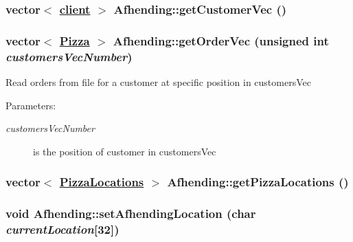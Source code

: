 \hypertarget{class_afhending_3970b0afe27b514282442b11592e1602}{
\subsubsection[getCustomerVec]{\setlength{\rightskip}{0pt plus 5cm}vector$<$ \hyperlink{classclient}{client} $>$ Afhending::get\-Customer\-Vec ()}}
\label{class_afhending_3970b0afe27b514282442b11592e1602}


\hypertarget{class_afhending_ad0cbeddec394b25c5eade57247f4110}{
\subsubsection[getOrderVec]{\setlength{\rightskip}{0pt plus 5cm}vector$<$ \hyperlink{class_pizza}{Pizza} $>$ Afhending::get\-Order\-Vec (unsigned int {\em customers\-Vec\-Number})}}
\label{class_afhending_ad0cbeddec394b25c5eade57247f4110}


Read orders from file for a customer at specific position in customers\-Vec

\begin{Desc}
\item[Parameters:]
\begin{description}
\item[{\em customers\-Vec\-Number}]is the position of customer in customers\-Vec \end{description}
\end{Desc}
\hypertarget{class_afhending_3d38e7498fba59674c7d3838bf4c1824}{
\subsubsection[getPizzaLocations]{\setlength{\rightskip}{0pt plus 5cm}vector$<$ \hyperlink{class_pizza_locations}{Pizza\-Locations} $>$ Afhending::get\-Pizza\-Locations ()}}
\label{class_afhending_3d38e7498fba59674c7d3838bf4c1824}


\hypertarget{class_afhending_411cc45b50d4a59a33d76f6c54e52f78}{
\subsubsection[setAfhendingLocation]{\setlength{\rightskip}{0pt plus 5cm}void Afhending::set\-Afhending\-Location (char {\em current\-Location}\mbox{[}32\mbox{]})}}
\label{class_afhending_411cc45b50d4a59a33d76f6c54e52f78}


